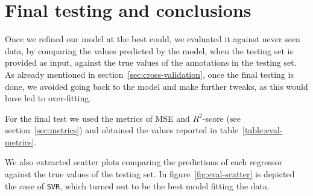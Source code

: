 \section{Final testing and conclusions}\label{sec:conclusions}

Once we refined our model at the best could, we evaluated it against never seen data, by comparing the values predicted by the model, when the testing set is provided as input, against the true values of the annotations in the testing set. As already mentioned in section~\ref{sec:cross-validation}, once the final testing is done, we avoided going back to the model and make further tweaks, as this would have led to over-fitting.

For the final test we used the metrics of MSE and $R^2$-score (see section~\ref{sec:metrics}) and obtained the values reported in table~\ref{table:eval-metrics}. 

\begin{table}[b]
	\centering
	\caption{Evaluation metrics}
	\label{table:eval-metrics}
\end{table}

We also extracted scatter plots comparing the predictions of each regressor against the true values of the testing set. In  figure~\ref{fig:eval-scatter} is depicted the case of \texttt{SVR}, which turned out to be the best model fitting the data.

